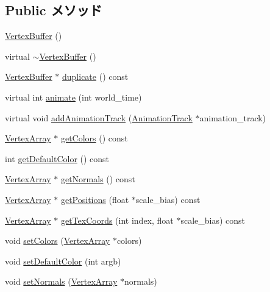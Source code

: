 \subsection*{Public メソッド}
\begin{CompactItemize}
\item 
\hyperlink{classm3g_1_1VertexBuffer_fd7b13840c99c57d27316c8f8434dc49}{VertexBuffer} ()
\item 
virtual \hyperlink{classm3g_1_1VertexBuffer_0e5e1dbdc4295ff9aa1e15e0ce3624af}{$\sim$VertexBuffer} ()
\item 
\hyperlink{classm3g_1_1VertexBuffer}{VertexBuffer} $\ast$ \hyperlink{classm3g_1_1VertexBuffer_d069984e7455bfe074cab9497b47cadf}{duplicate} () const 
\item 
virtual int \hyperlink{classm3g_1_1VertexBuffer_8aad1ceab4c2a03609c8a42324ce484d}{animate} (int world\_\-time)
\item 
virtual void \hyperlink{classm3g_1_1VertexBuffer_415c0b110f95410ded9b85e5d99a496b}{addAnimationTrack} (\hyperlink{classm3g_1_1AnimationTrack}{AnimationTrack} $\ast$animation\_\-track)
\item 
\hyperlink{classm3g_1_1VertexArray}{VertexArray} $\ast$ \hyperlink{classm3g_1_1VertexBuffer_e3bdc8503242a6d278230352d03e5893}{getColors} () const 
\item 
int \hyperlink{classm3g_1_1VertexBuffer_4e33b93a98ce0632d51e7ae775ae5b1e}{getDefaultColor} () const 
\item 
\hyperlink{classm3g_1_1VertexArray}{VertexArray} $\ast$ \hyperlink{classm3g_1_1VertexBuffer_0f4341d1215ff8f4efeaa40a21327c0c}{getNormals} () const 
\item 
\hyperlink{classm3g_1_1VertexArray}{VertexArray} $\ast$ \hyperlink{classm3g_1_1VertexBuffer_5ca059361f9f834dd00b5d595bf3df0b}{getPositions} (float $\ast$scale\_\-bias) const 
\item 
\hyperlink{classm3g_1_1VertexArray}{VertexArray} $\ast$ \hyperlink{classm3g_1_1VertexBuffer_9015840c09da0691c31a8aab5e09404a}{getTexCoords} (int index, float $\ast$scale\_\-bias) const 
\item 
void \hyperlink{classm3g_1_1VertexBuffer_e5a5933252e3ec3afa0a83698b5b3521}{setColors} (\hyperlink{classm3g_1_1VertexArray}{VertexArray} $\ast$colors)
\item 
void \hyperlink{classm3g_1_1VertexBuffer_57fc3a141397f1287061a204c128c1b3}{setDefaultColor} (int argb)
\item 
void \hyperlink{classm3g_1_1VertexBuffer_4aabe6277538d5aa8285759dab85002a}{setNormals} (\hyperlink{classm3g_1_1VertexArray}{VertexArray} $\ast$normals)

\end{CompactItemize}
